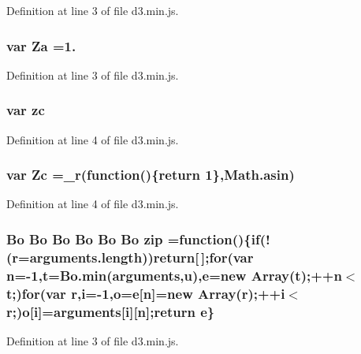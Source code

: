 Definition at line 3 of file d3.\+min.\+js.

\subsubsection[{Za}]{\setlength{\rightskip}{0pt plus 5cm}var Za =1.}\label{d3_8min_8js_ac0701559560e3eda144588bd994df442}


Definition at line 3 of file d3.\+min.\+js.

\subsubsection[{zc}]{\setlength{\rightskip}{0pt plus 5cm}var zc}\label{d3_8min_8js_a90d700bf9249eb6e162ee351d5f8b3c4}


Definition at line 4 of file d3.\+min.\+js.

\subsubsection[{Zc}]{\setlength{\rightskip}{0pt plus 5cm}var Zc ={\bf \+\_\+r}(function()\{{\bf return} 1\},Math.\+asin)}\label{d3_8min_8js_a03a847e569c7524005a7dc567eee17e0}


Definition at line 4 of file d3.\+min.\+js.

\subsubsection[{zip}]{ {\bf Bo} {\bf Bo} {\bf Bo} {\bf Bo} {\bf Bo} {\bf Bo} zip =function()\{{\bf if}(!({\bf r}=arguments.\+length)){\bf return}[$\,$];{\bf for}(var {\bf n}=-\/1,t={\bf Bo.\+min}(arguments,u),{\bf e}=new Array(t);++{\bf n}$<$t;){\bf for}(var {\bf r},{\bf i}=-\/1,{\bf o}={\bf e}[{\bf n}]=new Array({\bf r});++{\bf i}$<${\bf r};){\bf o}[{\bf i}]=arguments[{\bf i}][{\bf n}];{\bf return} {\bf e}\}}\label{d3_8min_8js_a6e43eb88327e3b9666e5b2914bccfe09}


Definition at line 3 of file d3.\+min.\+js.

